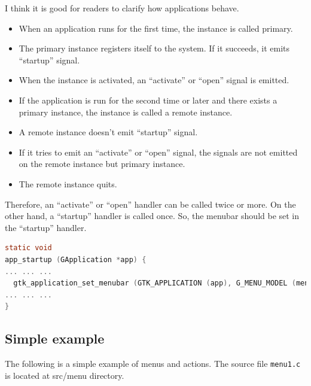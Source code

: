 I think it is good for readers to clarify how applications behave.

\begin{itemize}
\tightlist
\item
  When an application runs for the first time, the instance is called
  primary.
\item
  The primary instance registers itself to the system. If it succeeds,
  it emits ``startup'' signal.
\item
  When the instance is activated, an ``activate'' or ``open'' signal is
  emitted.
\item
  If the application is run for the second time or later and there
  exists a primary instance, the instance is called a remote instance.
\item
  A remote instance doesn't emit ``startup'' signal.
\item
  If it tries to emit an ``activate'' or ``open'' signal, the signals
  are not emitted on the remote instance but primary instance.
\item
  The remote instance quits.
\end{itemize}

Therefore, an ``activate'' or ``open'' handler can be called twice or
more. On the other hand, a ``startup'' handler is called once. So, the
menubar should be set in the ``startup'' handler.

\begin{lstlisting}[language=C]
static void
app_startup (GApplication *app) {
... ... ...
  gtk_application_set_menubar (GTK_APPLICATION (app), G_MENU_MODEL (menubar));
... ... ...
}
\end{lstlisting}

\subsection{Simple example}\label{simple-example}

The following is a simple example of menus and actions. The source file
\passthrough{\lstinline!menu1.c!} is located at src/menu directory.

